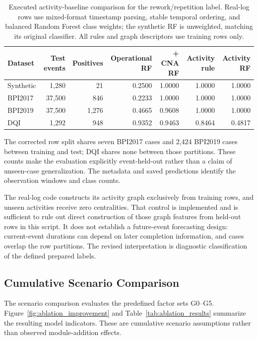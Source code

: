 \documentclass[pdflatex,iicol,Numbered,sn-basic]{sn-jnl}
\begin{document}
\begin{table}[t]
\caption{Executed activity-baseline comparison for the rework/repetition label. Real-log rows use mixed-format timestamp parsing, stable temporal ordering, and balanced Random Forest class weights; the synthetic RF is unweighted, matching its original classifier. All rules and graph descriptors use training rows only.}
\label{tab:real_activity_audit}
\centering\small
\begin{tabular}{lrrrrrr}
\toprule
Dataset & Test events & Positives & Operational RF & + CNA RF & Activity rule & Activity RF\\
\midrule
Synthetic & 1,280 & 21 & 0.2500 & 1.0000 & 1.0000 & 1.0000 \\
BPI2017 & 37,500 & 846 & 0.2233 & 1.0000 & 1.0000 & 1.0000 \\
BPI2019 & 37,500 & 1,276 & 0.4665 & 0.9608 & 1.0000 & 1.0000 \\
DQI & 1,292 & 948 & 0.9352 & 0.9463 & 0.8464 & 0.4817 \\
\bottomrule
\end{tabular}
\end{table}

The corrected row split shares seven BPI2017 cases and 2,424 BPI2019 cases between training and test; DQI shares none between those partitions. These counts make the evaluation explicitly event-held-out rather than a claim of unseen-case generalization. The metadata and saved predictions identify the observation windows and class counts.

The real-log code constructs its activity graph exclusively from training rows, and unseen activities receive zero centralities. That control is implemented and is sufficient to rule out direct construction of those graph features from held-out rows in this script. It does not establish a future-event forecasting design: current-event durations can depend on later completion information, and cases overlap the row partitions. The revised interpretation is diagnostic classification of the defined prepared labels.

\subsection{Cumulative Scenario Comparison}
\label{subsec:ablation_results}

The scenario comparison evaluates the predefined factor sets G0--G5. Figure~\ref{fig:ablation_improvement} and Table~\ref{tab:ablation_results} summarize the resulting model indicators. These are cumulative scenario assumptions rather than observed module-addition effects.
\end{document}
